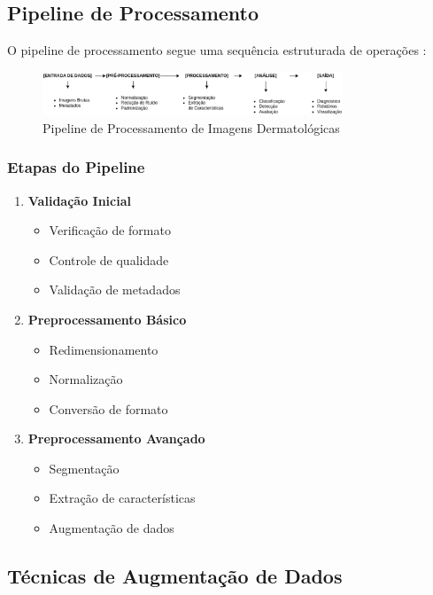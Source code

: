 \subsection{Pipeline de Processamento}

O pipeline de processamento segue uma sequência estruturada de operações \cite{wang2023automated}:

\begin{figure}[h]
\centering
\includegraphics[width=0.8\textwidth]{figuras/pipeline_processamento.eps}
\caption{Pipeline de Processamento de Imagens Dermatológicas}
\label{fig:pipeline_proc}
\end{figure}

\subsubsection{Etapas do Pipeline}
\begin{enumerate}
\item \textbf{Validação Inicial}
\begin{itemize}
\item Verificação de formato
\item Controle de qualidade
\item Validação de metadados
\end{itemize}

\item \textbf{Preprocessamento Básico}
\begin{itemize}
    \item Redimensionamento
    \item Normalização
    \item Conversão de formato
\end{itemize}

\item \textbf{Preprocessamento Avançado}
\begin{itemize}
    \item Segmentação
    \item Extração de características
    \item Augmentação de dados
\end{itemize}
\end{enumerate}

\subsection{Técnicas de Augmentação de Dados}

